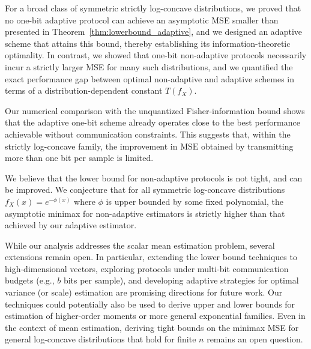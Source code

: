 \documentclass[10pt]{article} %
\theoremstyle{plain}
\theoremstyle{definition}
\theoremstyle{remark}
\newcommand{\mse}{\mathrm{MSE}}
\newcommand{\rkcomment}[1]{\textcolor{blue}{RK: #1}}
\begin{document}
\par For a broad class of symmetric strictly log-concave distributions, we proved that no one-bit adaptive protocol can achieve an asymptotic MSE smaller than presented in Theorem~\ref{thm:lowerbound_adaptive}, and we designed an adaptive scheme that attains this bound, thereby establishing its information-theoretic optimality. In contrast, we showed that one-bit non-adaptive protocols necessarily incur a strictly larger MSE for many such distributions, and we quantified the exact performance gap between optimal non-adaptive and adaptive schemes in terms of a distribution-dependent constant $T(f_X)$. 
\par %
Our numerical comparison with the unquantized Fisher-information bound shows that the adaptive one-bit scheme already operates close to the best performance achievable without communication constraints. This suggests that, within the strictly log-concave family, the improvement in $\mse$ obtained by transmitting more than one bit per sample is limited.

\par We believe that the lower bound for non-adaptive protocols is not tight, and can be improved.
We conjecture that for all symmetric log-concave distributions $f_X(x)=e^{-\phi(x)}$ where $\phi$ is upper bounded by some fixed polynomial, the asymptotic minimax for non-adaptive estimators is strictly higher than that achieved by our adaptive estimator. 

\par While our analysis addresses the scalar mean estimation problem, several extensions remain open. In particular, extending the lower bound techniques to high-dimensional vectors, exploring protocols under multi-bit communication budgets (e.g., $b$ bits per sample), and developing adaptive strategies for optimal variance (or scale) estimation are promising directions for future work. Our techniques could potentially also be used to derive upper and lower bounds for estimation of higher-order moments or more general exponential families. Even in the context of mean estimation, deriving tight bounds on the minimax MSE for general log-concave distributions that hold for finite $n$ remains an open question. 
\end{document}
